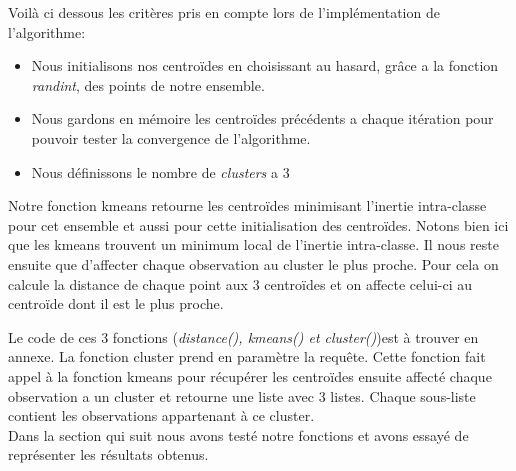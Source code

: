 \documentclass[]{report}
\begin{document}
	Voilà ci dessous les critères pris en compte lors de l'implémentation de l'algorithme:
	\begin{itemize}
		\item Nous initialisons nos centroïdes en choisissant au hasard, grâce a la fonction \textit{randint}, des points de notre ensemble. 
		\item Nous gardons en mémoire les centroïdes précédents a chaque itération pour pouvoir tester la convergence de l'algorithme.
		\item Nous définissons le nombre de \textit{clusters} a 3
	\end{itemize}
	
	Notre fonction kmeans retourne les centroïdes minimisant l'inertie intra-classe pour cet ensemble et aussi pour cette initialisation des centroïdes. Notons bien ici que les kmeans trouvent un minimum local de l'inertie intra-classe. Il nous reste ensuite que d'affecter chaque observation au cluster le plus proche. Pour cela on calcule la distance de chaque point aux 3 centroïdes et on affecte celui-ci au centroïde dont il est le  plus proche.\
	
	Le code de ces 3 fonctions (\textit{distance(), kmeans() et cluster()})est à trouver en annexe. La fonction cluster prend en paramètre la requête. Cette fonction fait appel à la fonction kmeans pour récupérer les centroïdes ensuite affecté chaque observation a un cluster et retourne une liste avec 3 listes. Chaque sous-liste contient les observations appartenant à ce cluster.\\
	Dans la section qui suit nous avons testé notre fonctions et avons essayé de représenter les résultats obtenus.
	
\end{document}

